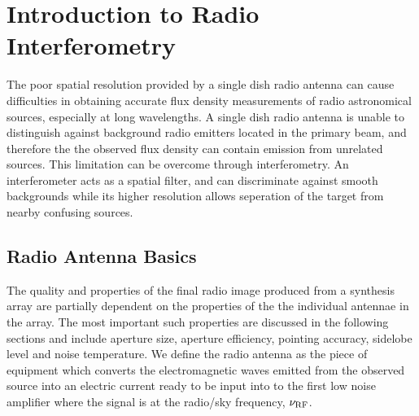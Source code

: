 

\chapter{Introduction to Radio Interferometry} 
\label{chap:2}

The poor spatial resolution provided by a single dish radio antenna can cause difficulties in obtaining accurate flux density measurements of radio astronomical sources, especially at long wavelengths. A single dish radio antenna is unable to distinguish against background radio emitters located in the primary beam, and therefore the the observed flux density can contain emission from unrelated sources. This limitation can be overcome through interferometry. An interferometer acts as a spatial filter, and can discriminate against smooth backgrounds while its higher resolution allows seperation of the target from nearby confusing sources. 

\section{Radio Antenna Basics}\label{sec:1}
The quality and properties of the final radio image produced from a synthesis array are partially dependent on the properties of the the individual antennae in the array. The most important such properties are discussed in the following sections and include aperture size, aperture efficiency, pointing accuracy, sidelobe level and noise temperature. We define the radio antenna as the piece of equipment which converts the electromagnetic waves emitted from the observed source into an electric current ready to be input into to the first low noise amplifier where the signal is at the radio/sky frequency, $\nu _{\rm{RF}}$.
